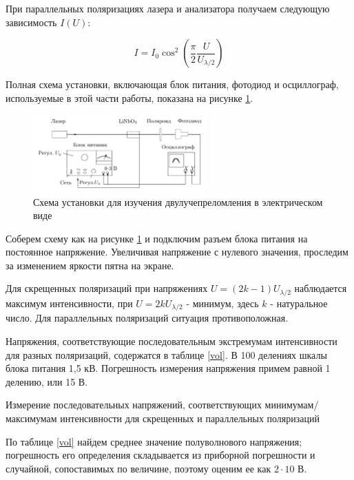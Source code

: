 \documentclass[12pt]{kiarticle}
\begin{document}
	При параллельных поляризациях лазера и анализатора получаем следующую зависимость $I(U)$:
	
	\begin{equation}
		I = I_0 \cos^2\left(\frac{\pi}{2}\frac{U}{U_{\lambda/2}}\right)
	\end{equation} 
	
	Полная схема установки, включающая блок питания, фотодиод и осциллограф, используемые в этой части работы, показана на рисунке \ref{full}. 
	
	\begin{figure}[h]
		\centering	
		\includegraphics[width=0.6\textwidth]{fullpic.png}
		\caption{Схема установки для изучения двулучепреломления в электрическом виде}
		\label{full}
	\end{figure}
	
	Соберем схему как на рисунке \ref{full} и подключим разъем блока питания на постоянное напряжение. Увеличивая напряжение с нулевого значения, проследим за изменением яркости пятна на экране. 
	
	Для скрещенных поляризаций при напряжениях $U = (2k - 1)U_{\lambda/2}$ наблюдается максимум интенсивности, при $U = 2kU_{\lambda/2}$ - минимум, здесь $k$ - натуральное число. Для параллельных поляризаций ситуация противоположная. 
	
	Напряжения, соответствующие последовательным экстремумам интенсивности для разных поляризаций, содержатся в таблице \ref{vol}.	В 100 делениях шкалы блока питания 1,5 кВ. Погрешность измерения напряжения примем равной 1 делению, или 15 В. 
	
	\begin{table}[h]
		\centering
		
		\caption{Измерение последовательных напряжений, соответствующих минимумам/максимумам интенсивности для скрещенных и параллельных поляризаций}
		\label{vol}
	\end{table}	
	
	По таблице \ref{vol} найдем среднее значение полуволнового напряжения; погрешность его определения складывается из приборной погрешности и случайной, сопоставимых по величине, поэтому оценим ее как $2\cdot 10$ В. 
	
\end{document}
